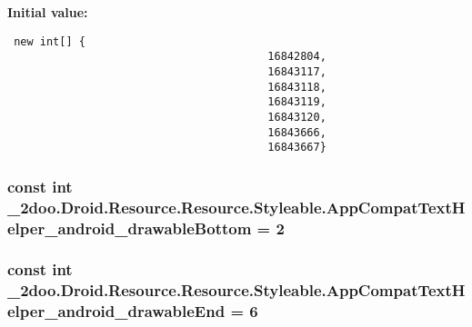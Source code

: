 \textbf{Initial value:}

\begin{Code}\begin{verbatim} new int[] {
                                        16842804,
                                        16843117,
                                        16843118,
                                        16843119,
                                        16843120,
                                        16843666,
                                        16843667}
\end{verbatim}
\end{Code}
\hypertarget{class__2doo_1_1_droid_1_1_resource_1_1_styleable_7c9cf9c5b80d9ecfd2fd68ee386cd5b7}{
\subsubsection[{AppCompatTextHelper\_\-android\_\-drawableBottom}]{\setlength{\rightskip}{0pt plus 5cm}const int \_\-2doo.Droid.Resource.Resource.Styleable.AppCompatTextHelper\_\-android\_\-drawableBottom = 2}}
\label{class__2doo_1_1_droid_1_1_resource_1_1_styleable_7c9cf9c5b80d9ecfd2fd68ee386cd5b7}


\hypertarget{class__2doo_1_1_droid_1_1_resource_1_1_styleable_d1b38325a9dcd3d6cb0c4426ee0eb133}{
\subsubsection[{AppCompatTextHelper\_\-android\_\-drawableEnd}]{\setlength{\rightskip}{0pt plus 5cm}const int \_\-2doo.Droid.Resource.Resource.Styleable.AppCompatTextHelper\_\-android\_\-drawableEnd = 6}}
\label{class__2doo_1_1_droid_1_1_resource_1_1_styleable_d1b38325a9dcd3d6cb0c4426ee0eb133}


